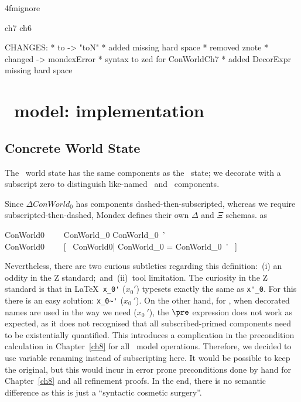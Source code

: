 \ai4fmignore{
\begin{zsection}
  \SECTION ch7 \parents ch6
\end{zsection}
CHANGES:
* to -> "toN"
* added missing hard space
* removed znote
* changed \bot -> mondexError
* syntax to zed for ConWorldCh7
* added DecorExpr missing hard space
}

\chapter{\Conc\ model: implementation}\label{ch7}

\section{Concrete World State}

The \Conc\ world state has the same components as the \Betw\ state;
we decorate with a subscript zero to distinguish like-named \Betw\
and \Conc\ components.

Since $\Delta ConWorld_0$ has components dashed-then-subscripted,
whereas we require subscripted-then-dashed, Mondex defines their own
$\Delta$ and $\Xi$ schemas. as
\newcommand{\DeltaConWorldO}{\Delta ConWorld0}
\newcommand{\XiConWorldO}{\Xi ConWorld0}
%
\begin{gzed}
  \DeltaConWorldO ~~~~ ConWorld_0 \land ConWorld_0~' \\
  \XiConWorldO ~~\defs~~ [~ \DeltaConWorldO | \theta ConWorld_0 = \theta ConWorld_0~' ~]
\end{gzed}
%
Nevertheless, there are two curious subtleties regarding this
definition:~(i) an oddity in the Z standard;~and~(ii)~tool
limitation. The curiosity in the Z standard is that in \LaTeX\
\verb+x_0'+ ($x_0'$) typesets exactly the same as \verb+x'_0+. For
this there is an easy solution: \verb+x_0~'+ ($x_0~'$). On the other
hand, for \zeves, when decorated names are used in the way we need
($x_0~'$), the $\pre$ expression does not work as expected, as it
does not recognised that all subscribed-primed components need to be
existentially quantified. This introduces a complication in the
precondition calculation in Chapter~\ref{ch8} for all \Conc\ model
operations. Therefore, we decided to use variable renaming instead
of subscripting here. It would be possible to keep the original, but
this would incur in error prone preconditions done by hand for
Chapter~\ref{ch8} and all refinement proofs. In the end, there is no
semantic difference as this is just a ``syntactic cosmetic
surgery''.

